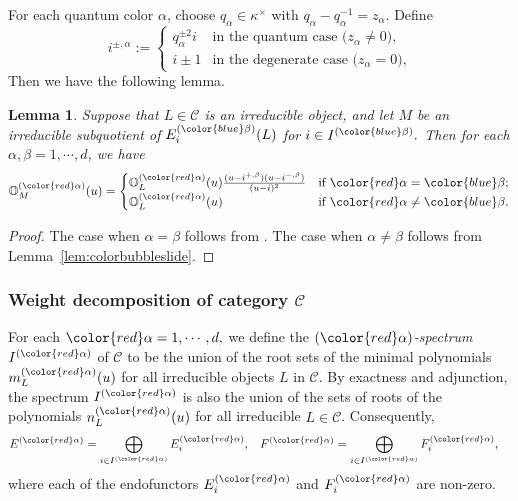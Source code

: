 \documentclass[12pt]{amsart}
\numberwithin{itemcounter}{subsection}
\theoremstyle{plain}
\newtheorem{lemma}[theorem]{Lemma}
\theoremstyle{definition}
\theoremstyle{remark}
\numberwithin{equation}{section}
\def\bbO{\mathbb{O}}
\def\kk{\kappa}
\def\calC{\mathcal{C}}
\def\red#1{{\color{red} #1}}
\def\blue#1{{\color{blue} #1}}
\begin{document}
For each quantum color $\alpha$, choose $q_\alpha\in\kk^\times$ with $q_\alpha-q_\alpha^{-1}=z_\alpha$. Define
\begin{equation}
\label{eq:ipm}
	i^{\pm,\alpha} := \left\{\begin{array}{ll}
		q_\alpha^{\pm 2} i&\text{in the quantum case ($z_\alpha\neq 0$),}\\
		i\pm 1&\text{in the degenerate case ($z_\alpha = 0$),}
	\end{array}\right.
\end{equation}
Then we have the following lemma.
\begin{lemma}
\label{lem:choose}
	Suppose that $L\in \calC$ is an irreducible object, and let $M$ be an irreducible subquotient of  $E_i^{(\blue{\beta})}(L)$ for $i\in I^{(\blue{\beta})}.$
	Then for each $\alpha,\beta=1,\cdots,d$, we have
	\begin{align*}
		\bbO^{(\red{\alpha})}_M(u)=\begin{cases}
			\bbO^{(\red{\alpha})}_L(u)\frac{ (u-i^{+,\beta})(u-i^{-,\beta})}{(u-i)^2}
			&\text{if ${\red{\alpha}}={\blue{\beta}}$};\\
			\bbO^{(\red{\alpha})}_L(u)&\text{if ${\red{\alpha}}\neq{\blue{\beta}}$}.
		\end{cases}
	\end{align*}
\end{lemma}
\begin{proof}
	The case when $\alpha=\beta$ follows from \cite[Lemma 4.5]{BSW20a}. The case when $\alpha\neq \beta$ follows from Lemma~\ref{lem:colorbubbleslide}.
\end{proof}

\subsubsection{Weight decomposition of category $\calC$}
\label{sec:wtdecompC}
For each $\red{\alpha}=1,\cdots,d,$ we define the {\em $(\red{\alpha})$-spectrum} $I^{(\red{\alpha})}$ of $\calC$ to be the union of the root sets of the minimal polynomials $m^{(\red{\alpha})}_L(u)$ for all irreducible objects $L$ in $\calC$. By exactness and adjunction, the spectrum $I^{(\red{\alpha})}$ is also
the union of the sets of roots of the polynomials $n^{(\red{\alpha})}_L(u)$ for all irreducible $L \in \mathcal{C}$. Consequently,
\begin{align*}
	E^{(\red{\alpha})} &=
	\bigoplus_{i \in I^{(\red{\alpha})}} E^{(\red{\alpha})}_i,&
	F ^{(\red{\alpha})}&= \bigoplus_{i \in I^{(\red{\alpha})}} F^{(\red{\alpha})}_i,
\end{align*}
where each of the endofunctors
$E^{(\red{\alpha})}_i$ and $F^{(\red{\alpha})}_i$ are non-zero.
\end{document}
